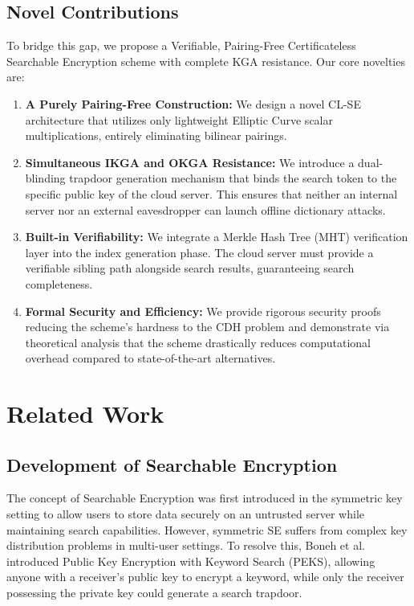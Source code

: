 \documentclass[10pt,journal,compsoc]{IEEEtran}
\begin{document}
\subsection{Novel Contributions}
To bridge this gap, we propose a Verifiable, Pairing-Free Certificateless Searchable Encryption scheme with complete KGA resistance. Our core novelties are:
\begin{enumerate}
    \item \textbf{A Purely Pairing-Free Construction:} We design a novel CL-SE architecture that utilizes only lightweight Elliptic Curve scalar multiplications, entirely eliminating bilinear pairings.
    \item \textbf{Simultaneous IKGA and OKGA Resistance:} We introduce a dual-blinding trapdoor generation mechanism that binds the search token to the specific public key of the cloud server. This ensures that neither an internal server nor an external eavesdropper can launch offline dictionary attacks.
    \item \textbf{Built-in Verifiability:} We integrate a Merkle Hash Tree (MHT) verification layer into the index generation phase. The cloud server must provide a verifiable sibling path alongside search results, guaranteeing search completeness.
    \item \textbf{Formal Security and Efficiency:} We provide rigorous security proofs reducing the scheme's hardness to the CDH problem and demonstrate via theoretical analysis that the scheme drastically reduces computational overhead compared to state-of-the-art alternatives.
\end{enumerate}

\section{Related Work}\label{sec:related}
\subsection{Development of Searchable Encryption}
The concept of Searchable Encryption was first introduced in the symmetric key setting to allow users to store data securely on an untrusted server while maintaining search capabilities. However, symmetric SE suffers from complex key distribution problems in multi-user settings. To resolve this, Boneh et al. introduced Public Key Encryption with Keyword Search (PEKS), allowing anyone with a receiver's public key to encrypt a keyword, while only the receiver possessing the private key could generate a search trapdoor.
\end{document}
